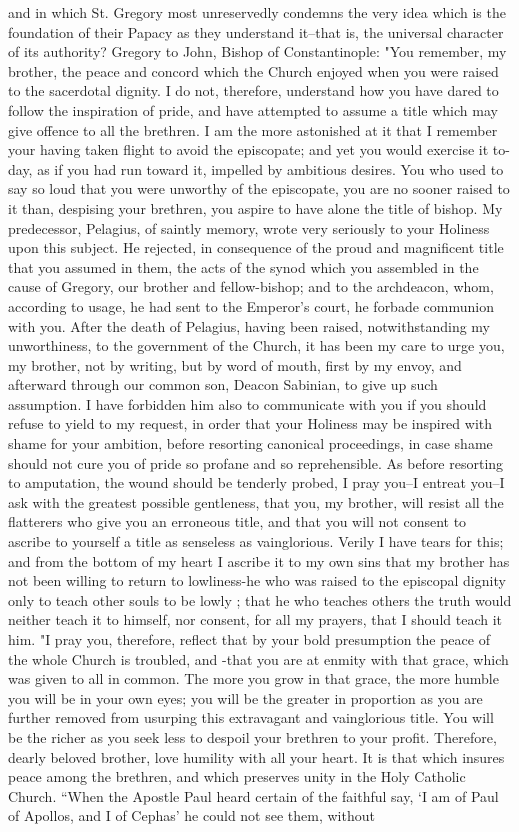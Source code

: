 and in which St. Gregory most unreservedly condemns the very idea which is the foundation of their Papacy as they understand it--that is, the universal character of its authority? Gregory to John, Bishop of Constantinople: "You remember, my brother, the peace and concord which the Church enjoyed when you were raised to the sacerdotal dignity. I do not, therefore, understand how you have dared to follow the inspiration of pride, and have attempted to assume a title which may give offence to all the brethren. I am the more astonished at it that I remember your having taken flight to avoid the episcopate; and yet you would exercise it to-day, as if you had run toward it, impelled by ambitious desires. You who used to say so loud that you were unworthy of the episcopate, you are no sooner raised to it than, despising your brethren, you aspire to have alone the title of bishop. My predecessor, Pelagius, of saintly memory, wrote very seriously to your Holiness upon this subject. He rejected, in consequence of the proud and magnificent title that you assumed in them, the acts of the synod which you assembled in the cause of Gregory, our brother and fellow-bishop; and to the archdeacon, whom, according to usage, he had sent to the Emperor's court, he forbade communion with you. After the death of Pelagius, having been raised, notwithstanding my unworthiness, to the government of the Church, it has been my care to urge you, my brother, not by writing, but by word of mouth, first by my envoy, and afterward through our common son, Deacon Sabinian, to give up such assumption. I have forbidden him also to communicate with you if you should refuse to yield to my request, in order that your Holiness may be inspired with shame for your ambition, before resorting canonical proceedings, in case shame should not cure you of pride so profane and so reprehensible. As before resorting to amputation, the wound should be tenderly probed, I pray you--I entreat you--I ask with the greatest possible gentleness, that you, my brother, will resist all the flatterers who give you an erroneous title, and that you will not consent to ascribe to yourself a title as senseless as vainglorious. Verily I have tears for this; and from the bottom of my heart I ascribe it to my own sins that my brother has not been willing to return to lowliness-he who was raised to the episcopal dignity only to teach other souls to be lowly ; that he who teaches others the truth would neither teach it to himself, nor consent, for all my prayers, that I should teach it him. "I pray you, therefore, reflect that by your bold presumption the peace of the whole Church is troubled, and -that you are at enmity with that grace, which was given to all in common. The more you grow in that grace, the more humble you will be in your own eyes; you will be the greater in proportion as you are further removed from usurping this extravagant and vainglorious title. You will be the richer as you seek less to despoil your brethren to your profit. Therefore, dearly beloved brother, love humility with all your heart. It is that which insures peace among the brethren, and which preserves unity in the Holy Catholic Church. “When the Apostle Paul heard certain of the faithful say, ‘I am of Paul of Apollos, and I of Cephas’ he could not see them, without 